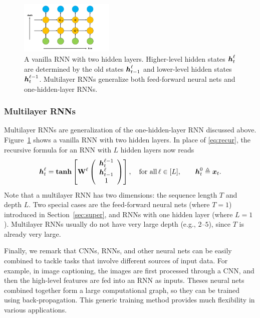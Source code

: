 \begin{figure}
\centering
\includegraphics[width = 0.4\textwidth]{RNN2}
\caption{A vanilla RNN with two hidden layers. Higher-level hidden states $\text{\boldmath $h$}_t^{\ell}$ are determined by the old states $\text{\boldmath $h$}_{t-1}^\ell$ and lower-level hidden states $\text{\boldmath $h$}_t^{\ell-1}$. Multilayer RNNs generalize both feed-forward neural nets and one-hidden-layer RNNs.}\label{fig:RNN2}
\end{figure}

\subsubsection{Multilayer RNNs} Multilayer RNNs are generalization of the one-hidden-layer RNN discussed above. Figure~\ref{fig:RNN2} shows a vanilla RNN with two hidden layers. In place of \eqref{eq:recur}, the recursive formula for an RNN with $L$ hidden layers now reads
\begin{equation*}
\text{\boldmath $h$}_t^{\ell} =  \mathrm{\textbf{tanh}} \left[\mathrm{\bf W}^\ell \left( \begin{array}{c} \text{\boldmath $h$}_t^{\ell-1} \\ \text{\boldmath $h$}_{t-1}^\ell \\ 1 \end{array} \right) \right], \quad \text{for all}\, \ell \in [L], \qquad \text{\boldmath $h$}_t^{0} \triangleq \text{\boldmath $x$}_t.
\end{equation*}
Note that a multilayer RNN has two dimensions: the sequence length $T$ and depth $L$. Two special cases are the feed-forward neural nets (where $T=1$) introduced in Section~\ref{sec:super}, and RNNs with one hidden layer (where $L=1$). Multilayer RNNs usually do not have very large depth (e.g., $2$--$5$), since $T$ is already very large.

Finally, we remark that CNNs, RNNs, and other neural nets can be easily combined to tackle tasks that involve different sources of input data. For example, in image captioning, the images are first processed through a CNN, and then the high-level features are fed into an RNN as inputs. Theses neural nets combined together form a large computational graph, so they can be trained using back-propagation. This generic training method provides much flexibility in various applications.
